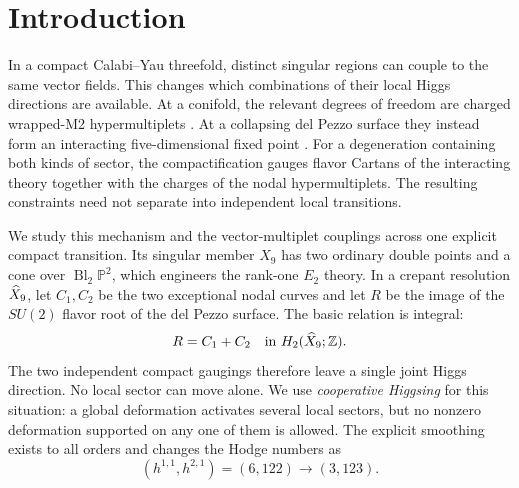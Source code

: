 \section{Introduction}
\label{sec:introduction}

In a compact Calabi--Yau threefold, distinct singular regions
can couple to the same vector fields. This changes which
combinations of their local Higgs directions are available.
At a conifold, the relevant degrees of freedom are charged
wrapped-M2 hypermultiplets
\cite{Strominger:1995Conifold,Greene:1995hu,Katz:1996}.
At a collapsing del Pezzo surface they instead form an
interacting five-dimensional fixed point
\cite{Seiberg:1996,Morrison:1996pp,Douglas:1996,Intriligator:1997}.
For a degeneration containing both kinds of sector, the
compactification gauges flavor Cartans of the interacting
theory together with the charges of the nodal hypermultiplets.
The resulting constraints need not separate into independent
local transitions.

We study this mechanism and the vector-multiplet couplings
across one explicit compact transition. Its singular member
$X_9$ has two ordinary double points and a cone over
$\operatorname{Bl}_2\mathbb P^2$, which engineers the
rank-one $E_2$ theory. In a crepant resolution $\widehat X_9$,
let $C_1,C_2$ be the two exceptional nodal curves and let
$R$ be the image of the $SU(2)$ flavor root of the del Pezzo
surface. The basic relation is integral:
\begin{equation}
 R=C_1+C_2\quad\hbox{in }H_2(\widehat X_9;\mathbb Z).
\label{eq:intro-root-relation}
\end{equation}
The two independent compact gaugings therefore leave a single
joint Higgs direction. No local sector can move alone.
We use \emph{cooperative Higgsing} for this situation: a
global deformation activates several local sectors, but no
nonzero deformation supported on any one of them is allowed.
The explicit smoothing exists to all orders and changes
the Hodge numbers as
\begin{equation}
 (h^{1,1},h^{2,1})=(6,122)\longrightarrow(3,123).
\label{eq:intro-hodge-change}
\end{equation}

